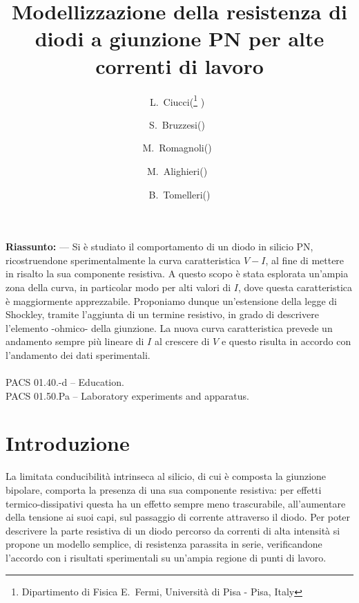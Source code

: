 \documentclass{article}[a4paper, oneside, 11pt]
\title{Modellizzazione della resistenza di diodi a giunzione PN per alte 
correnti di lavoro}
\author{L.~Ciucci(\thanks{Dipartimento di Fisica E.~Fermi, Universit\`a di Pisa 
- Pisa, Italy} )~\and S.~Bruzzesi(\protect\footnotemark[1] )~\and 
M.~Romagnoli(\protect\footnotemark[1] )~\and 
M.~Alighieri(\protect\footnotemark[1] )~\and 
B.~Tomelleri(\protect\footnotemark[1] )}
\begin{document}
\maketitle

\begin{mdframed}
\textbf{Riassunto:} --- Si è studiato il comportamento di un diodo in silicio
PN, ricostruendone sperimentalmente la curva caratteristica $V-I$, al fine di
mettere in risalto la sua componente resistiva. A questo scopo è stata
esplorata un'ampia zona della curva, in particolar modo per alti valori di
$I$, dove questa caratteristica è maggiormente apprezzabile. Proponiamo dunque
un'estensione della legge di Shockley, tramite l'aggiunta di un termine
resistivo, in grado di descrivere l'elemento -ohmico- della giunzione.
La nuova curva caratteristica prevede un andamento sempre più lineare di $I$
al crescere di $V$ e questo risulta in accordo con l'andamento dei dati
sperimentali.
\\\\
PACS 01.40.-d – Education.\\
PACS 01.50.Pa – Laboratory experiments and apparatus.
\end{mdframed}


\section{Introduzione}
La limitata conducibilità intrinseca al silicio, di cui è composta la
giunzione bipolare, comporta la presenza di una sua componente resistiva:
per effetti termico-dissipativi questa ha un effetto sempre meno
trascurabile, all'aumentare della tensione ai suoi capi, sul passaggio di
corrente attraverso il diodo.
Per poter descrivere la parte resistiva di un diodo percorso da correnti
di alta intensità %
si propone un modello semplice, di resistenza parassita in serie, verificandone
l'accordo con i risultati sperimentali su un'ampia regione di punti di lavoro.

\end{document}
